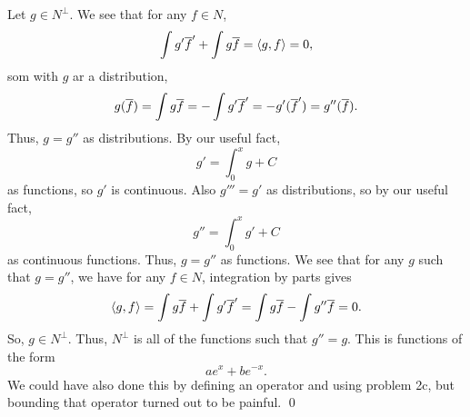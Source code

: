 \documentclass{article}
\begin{document}
\begin{enumerate}[(a)]
    \hop 
    Let $g \in N^\perp$. We see that for any $f \in N$, 
    \[\int g'{\overline{f}}' + \int g {\overline{f}} = \langle g,f\rangle = 0,\]
    som with $g$ ar a distribution,
    \[g({\overline{f}}) =\int g {\overline{f}} = -\int g'{\overline{f}}' =-g'({\overline{f}}') = g''({\overline{f}}).\]
    Thus, $g = g''$ as distributions. By our useful fact,
    \[g' = \int_0^x g + C\]
    as functions, so $g'$ is continuous. Also $g''' = g'$ as distributions, so by our useful fact,
    \[g'' = \int_0^x g' +C\]
    as continuous functions. Thus, $g = g''$ as functions. 
    \hop 
    We see that for any $g$ such that $g = g''$, we have for any $f \in N$, integration by parts gives
    \[\langle g,f\rangle = \int g{\overline{f}} + \int g' {\overline{f}}' = \int g{\overline{f}} - \int g'' {\overline{f}} = 0.\]
    So, $g \in N^\perp$. Thus, $N^\perp$ is all of the functions such that $g'' = g$. This is functions of the form 
    \[ae^x+be^{-x}.\]
    We could have also done this by defining an operator and using problem 2c, but bounding that operator turned out to be painful. \qed
\end{enumerate}
\end{document}
